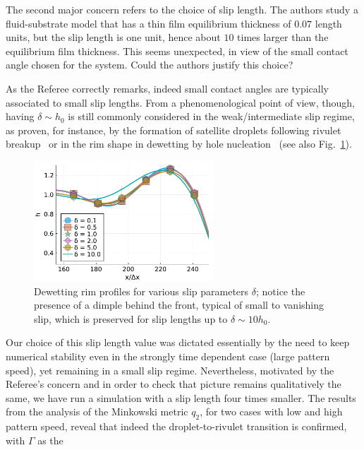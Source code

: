 \documentclass[12pt,english]{article}
\begin{document}
\begin{itemize}
{\item[ \textbf{\underline{Comment 2.}}]
The second major concern refers to the choice of slip length. 
The authors study a fluid-substrate model that has a thin film equilibrium thickness of 
$0.07$ length units, but the slip length is one unit, hence about $10$ times larger than the equilibrium film thickness. 
This seems unexpected, in view of the small contact angle chosen for the system. 
Could the authors justify this choice?
}

\item[ \textbf{Answer}]
{
As the Referee correctly remarks, indeed small contact angles are typically associated to small slip lengths. From a phenomenological point of view, 
though, having $\delta \sim h_0$ is still commonly considered in the weak/intermediate slip regime, as proven, for instance, 
by the formation of satellite 
droplets following rivulet breakup~\cite{peschka2019signatures} or 
in the rim shape in dewetting by hole nucleation~\cite{fetzer2007quantifying, munch2005lubrication} (see also Fig.~\ref{fig:slip}).
\begin{figure}
    \centering
    \includegraphics [width=0.6\textwidth]{refBFig_2.pdf}
    \caption{Dewetting rim profiles for various slip parameters $\delta$; notice the presence of a dimple behind the front, typical of 
    small to vanishing slip, which is preserved for slip lengths up to 
    $\delta \sim 10 h_0$.}
    \label{fig:slip}
\end{figure}
Our choice of this slip length value was dictated essentially by the need 
to keep numerical stability even in the strongly time dependent case 
(large pattern speed), yet remaining in a small slip regime. 
Nevertheless, motivated by the Referee's concern and in order to check that 
picture remains qualitatively the same, we have run a simulation with 
a slip length four times smaller. The results from the analysis of the Minkowski metric $q_2$, for two cases with low and high pattern speed, reveal that indeed
the droplet-to-rivulet transition is confirmed, with $\Gamma$ as the 
}
\end{itemize}
\end{document}
